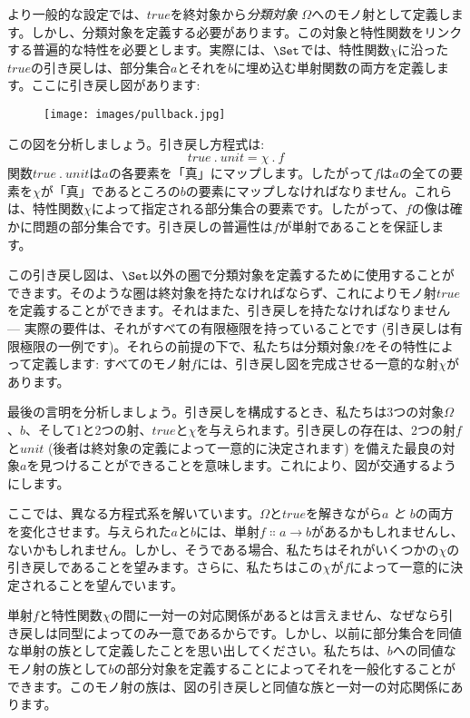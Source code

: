 より一般的な設定では、\(\mathit{true}\)を終対象から\emph{分類対象} \(\Omega\)へのモノ射として定義します。しかし、分類対象を定義する必要があります。この対象と特性関数をリンクする普遍的な特性を必要とします。実際には、\(\Set\)では、特性関数\(\chi\)に沿った\(\mathit{true}\)の引き戻しは、部分集合\(a\)とそれを\(b\)に埋め込む単射関数の両方を定義します。ここに引き戻し図があります: 

\begin{figure}[H]
  \centering
  \texttt{[image: images/pullback.jpg]}
\end{figure}

\noindent
この図を分析しましょう。引き戻し方程式は: 
\[\mathit{true}\ .\ \mathit{unit} = \chi\ .\ f\]
関数\(\mathit{true}\ .\ \mathit{unit}\)は\(a\)の各要素を「真」にマップします。したがって\(f\)は\(a\)の全ての要素を\(\chi\)が「真」であるところの\(b\)の要素にマップしなければなりません。これらは、特性関数\(\chi\)によって指定される部分集合の要素です。したがって、\(f\)の像は確かに問題の部分集合です。引き戻しの普遍性は\(f\)が単射であることを保証します。

この引き戻し図は、\(\Set\)以外の圏で分類対象を定義するために使用することができます。そのような圏は終対象を持たなければならず、これによりモノ射\(\mathit{true}\)を定義することができます。それはまた、引き戻しを持たなければなりません --- 実際の要件は、それがすべての有限極限を持っていることです (引き戻しは有限極限の一例です)。それらの前提の下で、私たちは分類対象\(\Omega\)をその特性によって定義します: すべてのモノ射\(f\)には、引き戻し図を完成させる一意的な射\(\chi\)があります。

最後の言明を分析しましょう。引き戻しを構成するとき、私たちは3つの対象\(\Omega\)、\(b\)、そして\(1\)と2つの射、\(\mathit{true}\)と\(\chi\)を与えられます。引き戻しの存在は、2つの射\(f\)と\(\mathit{unit}\) (後者は終対象の定義によって一意的に決定されます) を備えた最良の対象\(a\)を見つけることができることを意味します。これにより、図が交通するようにします。

ここでは、異なる方程式系を解いています。\(\Omega\)と\(\mathit{true}\)を解きながら\(a\) \emph{と} \(b\)の両方を変化させます。与えられた\(a\)と\(b\)には、単射\(f \Colon a \to b\)があるかもしれませんし、ないかもしれません。しかし、そうである場合、私たちはそれがいくつかの\(\chi\)の引き戻しであることを望みます。さらに、私たちはこの\(\chi\)が\(f\)によって一意的に決定されることを望んでいます。

単射\(f\)と特性関数\(\chi\)の間に一対一の対応関係があるとは言えません、なぜなら引き戻しは同型によってのみ一意であるからです。しかし、以前に部分集合を同値な単射の族として定義したことを思い出してください。私たちは、\(b\)への同値なモノ射の族として\(b\)の部分対象を定義することによってそれを一般化することができます。このモノ射の族は、図の引き戻しと同値な族と一対一の対応関係にあります。

